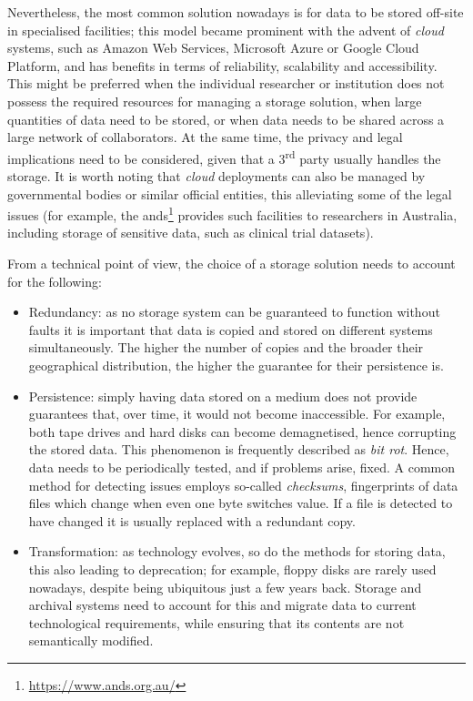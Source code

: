 Nevertheless, the most common solution nowadays is for data to  be stored off-site in specialised facilities; this model became prominent with the advent of \emph{cloud} systems, such as Amazon Web Services, Microsoft Azure or Google Cloud Platform, and has benefits in terms of reliability, scalability and accessibility. This might be preferred when the individual researcher or institution does not possess the required resources for managing a storage solution, when large quantities of data need to be stored, or when data needs to be shared across a large network of collaborators. At the same time, the privacy and legal implications need to be considered, given that a 3\textsuperscript{rd} party usually handles the storage. It is worth noting that \emph{cloud} deployments can also be managed by governmental bodies or similar official entities, this alleviating some of the legal issues (for example, the \gls{ands}\footnote{\url{https://www.ands.org.au/}} provides such facilities to researchers in Australia, including storage of sensitive data, such as clinical trial datasets).

From a technical point of view, the choice of a storage solution needs to account for the following:
\begin{itemize}
    \item Redundancy: as no storage system can be guaranteed to function without faults it is important that data is copied and stored on different systems simultaneously. The higher the number of copies and the broader their geographical distribution, the higher the guarantee for their persistence is.
    \item Persistence: simply having data stored on a medium does not provide guarantees that, over time, it would not become inaccessible. For example, both tape drives and hard disks can become demagnetised, hence corrupting the stored data. This phenomenon is frequently described as \emph{bit rot}. Hence, data needs to be periodically tested, and if problems arise, fixed. A common method for detecting issues employs so-called \emph{checksums}, fingerprints of data files which change when even one byte switches value. If a file is detected to have changed it is usually replaced with a redundant copy.
    \item Transformation: as technology evolves, so do the methods for storing data, this also leading to deprecation; for example, floppy disks are rarely used nowadays, despite being ubiquitous just a few years back. Storage and archival systems need to account for this and migrate data to current technological requirements, while ensuring that its contents are not semantically modified.
\end{itemize} 


